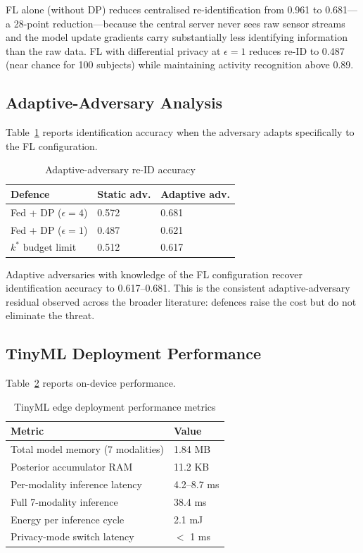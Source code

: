 \documentclass[sigconf,nonacm]{acmart}
\begin{document}
FL alone (without DP) reduces centralised re-identification from
0.961 to 0.681---a 28-point reduction---because the central
server never sees raw sensor streams and the model update
gradients carry substantially less identifying information than
the raw data. FL with differential privacy at $\epsilon = 1$
reduces re-ID to 0.487 (near chance for 100 subjects) while
maintaining activity recognition above 0.89.

\subsection{Adaptive-Adversary Analysis}

Table~\ref{tab:adaptive} reports identification accuracy when
the adversary adapts specifically to the FL configuration.

\begin{table}[h]
\caption{Adaptive-adversary re-ID accuracy}
\label{tab:adaptive}
\small
\begin{tabularx}{\columnwidth}{@{}p{2.8cm}X X@{}}
\toprule
\textbf{Defence} & \textbf{Static adv.} & \textbf{Adaptive adv.} \\
\midrule
Fed + DP ($\epsilon=4$)& 0.572 & 0.681 \\
Fed + DP ($\epsilon=1$)& 0.487 & 0.621 \\
$k^*$ budget limit     & 0.512 & 0.617 \\
\bottomrule
\end{tabularx}
\end{table}

Adaptive adversaries with knowledge of the FL configuration
recover identification accuracy to 0.617--0.681. This is the
consistent adaptive-adversary residual observed across the
broader literature: defences raise the cost but do not eliminate
the threat.

\subsection{TinyML Deployment Performance}

Table~\ref{tab:tinyml} reports on-device performance.

\begin{table}[h]
\caption{TinyML edge deployment performance metrics}
\label{tab:tinyml}
\small
\begin{tabularx}{\columnwidth}{@{}p{3.0cm}X@{}}
\toprule
\textbf{Metric} & \textbf{Value} \\
\midrule
Total model memory (7 modalities) & 1.84 MB \\
Posterior accumulator RAM         & 11.2 KB \\
Per-modality inference latency    & 4.2--8.7 ms \\
Full 7-modality inference         & 38.4 ms \\
Energy per inference cycle        & 2.1 mJ \\
Privacy-mode switch latency       & $<$ 1 ms \\
\bottomrule
\end{tabularx}
\end{table}
\end{document}
